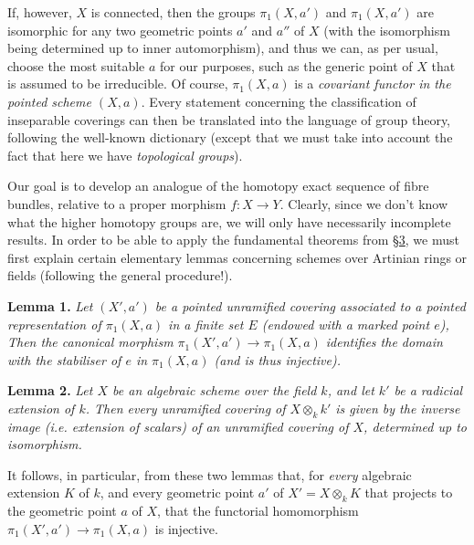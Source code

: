 \documentclass{article}
\newenvironment{itenv}[1]
  {\phantomsection\par\medskip\noindent\textbf{#1.}\itshape}
  {\par\medskip}
\newcommand{\oldpage}[1]{\marginpar{\footnotesize$\Big\vert$ \textit{p.~#1}}}
\begin{document}
If, however, $X$ is connected, then the groups $\pi_1(X,a')$ and $\pi_1(X,a')$ are isomorphic for any two geometric points $a'$ and $a''$ of $X$ (with the isomorphism being determined up to inner automorphism), and thus we can, as per usual, choose the most suitable $a$ for our purposes, such as the generic point of
\oldpage{182-19}
$X$ that is assumed to be irreducible.
Of course, $\pi_1(X,a)$ is a \emph{covariant functor in the pointed scheme $(X,a)$}.
Every statement concerning the classification of inseparable coverings can then be translated into the language of group theory, following the well-known dictionary (except that we must take into account the fact that here we have \emph{topological groups}).

Our goal is to develop an analogue of the homotopy exact sequence of fibre bundles, relative to a proper morphism $f\colon X\to Y$.
Clearly, since we don't know what the higher homotopy groups are, we will only have necessarily incomplete results.
In order to be able to apply the fundamental theorems from \hyperref[section3]{\S3}, we must first explain certain elementary lemmas concerning schemes over Artinian rings or fields (following the general procedure!).

\begin{itenv}{Lemma 1}
\label{lemma1}
  Let $(X',a')$ be a pointed unramified covering associated to a pointed representation of $\pi_1(X,a)$ in a finite set $E$ (endowed with a marked point $e$),
  Then the canonical morphism $\pi_1(X',a')\to\pi_1(X,a)$ identifies the domain with the stabiliser of $e$ in $\pi_1(X,a)$ (and is thus injective).
\end{itenv}

\begin{itenv}{Lemma 2}
\label{lemma2}
  Let $X$ be an algebraic scheme over the field $k$, and let $k'$ be a radicial extension of $k$.
  Then every unramified covering of $X\otimes_kk'$ is given by the inverse image (i.e. extension of scalars) of an unramified covering of $X$, determined up to isomorphism.
\end{itenv}

It follows, in particular, from these two lemmas that, for \emph{every} algebraic extension $K$ of $k$, and every geometric point $a'$ of $X'=X\otimes_kK$ that projects to the geometric point $a$ of $X$, that the functorial homomorphism $\pi_1(X',a')\to\pi_1(X,a)$ is injective.
\end{document}

